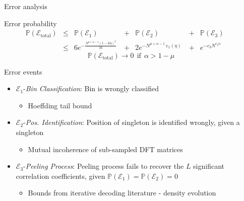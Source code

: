 \documentclass[10pt,xcolor=table]{beamer}
\newcommand{\mc}{\mathcal}
\newcommand{\mbb}{\mathbb}
\begin{document}
\begin{frame}{Error analysis}
\begin{block}{Error probability}
			\begin{align*}
			\mbb{P}(\mathcal{E}_{\text{total}}) & \leq &  \mbb{P}(\mathcal{E}_1)~~~~~ & + & \mbb{P}(\mc{E}_2)~~~~~~~~ & + & \mbb{P}(\mc{E}_3)~~~~~~~~\\
			&\leq & 6e^{-\frac{N^{\mu+\alpha-1}(1-6\eta)^2}{16}}~ & + & 2e^{-N^{\mu+\alpha-1} ~ c_1(\eta)}~ & + &  e^{-c_3 N^{c_4\alpha}}
			\end{align*}
			\[\boxed{	\mbb{P}(\mathcal{E}_{\text{total}}) \rightarrow 0  ~~\text{if}~~  \alpha >1-\mu}\]
		\end{block}
	

\begin{block}{Error events}
		\begin{itemize}\small
				\item {\color{blue}$\mathcal{E}_1${-\it Bin Classification}}: Bin is wrongly classified
                    \begin{itemize}
                      \item Hoeffding tail bound
                    \end{itemize}
                    \pause
				\item {\color{blue}$\mathcal{E}_2${-\it Pos. Identification}}: Position of singleton is identified wrongly, given a singleton
                    \begin{itemize}
                      \item Mutual incoherence of sub-sampled DFT matrices
                    \end{itemize}
                    \pause
				\item {\color{blue}$\mathcal{E}_3${-\it Peeling Process}}: Peeling process fails to recover the $L$ significant correlation coefficients, given $\mbb{P}(\mc{E}_1)= \mbb{P}(\mc{E}_2)=0$
                    \begin{itemize}
                      \item Bounds from iterative decoding literature - density evolution
                    \end{itemize}
		\end{itemize}
	\end{block}
\end{frame}
\end{document}
